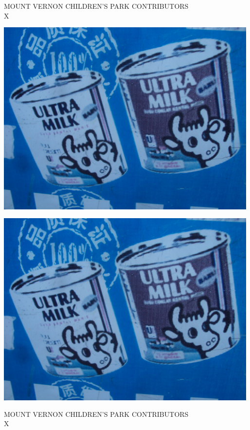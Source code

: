 \documentclass[10pt,letterpaper]{article}
\begin{document}
MOUNT VERNON CHILDREN'S PARK CONTRIBUTORS\\
X\\
\pagebreak

\includegraphics[width=5.19in]{landscape.jpg}

\vspace{0.25in}
\includegraphics[width=5.19in]{landscape.jpg}

MOUNT VERNON CHILDREN'S PARK CONTRIBUTORS\\
X\\
\pagebreak
\end{document}

